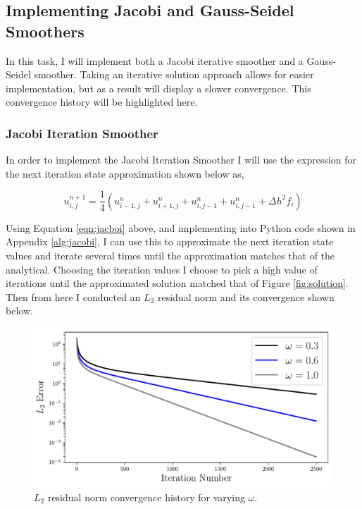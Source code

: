 \pagebreak
\subsection{Implementing Jacobi and Gauss-Seidel Smoothers}

In this task, I will implement both a Jacobi iterative smoother and a Gauss-Seidel smoother. Taking an iterative solution approach allows for easier implementation, but as a result will display a slower convergence. This convergence history will be highlighted here.

\subsubsection{Jacobi Iteration Smoother}
In order to implement the Jacobi Iteration Smoother I will use the expression for the next iteration state approximation shown below as,

\begin{equation}
    u_{i,j}^{n+1} = \frac{1}{4}\left(u_{i-1,j}^n + u_{i+1,j}^n + u_{i,j-1}^n + u_{i,j-1}^n + \Delta h^2f_i\right)
    \label{eqn:jacboi}
\end{equation}

Using Equation \ref{eqn:jacboi} above, and implementing into Python code shown in Appendix \ref{alg:jacobi}, I can use this to approximate the next iteration state values and iterate several times until the approximation matches that of the analytical. Choosing the iteration values I choose to pick a high value of iterations until the approximated solution matched that of Figure \ref{fig:solution}. Then from here I conducted an $L_2$ residual norm and its convergence shown below.

\begin{figure}[h]
    \centering
    \includegraphics[width = 0.9\linewidth]{tasks/figs/jacobi_l2.pdf}
    \caption[Jacboi Smoother Iteration]{$L_2$ residual norm convergence history for varying $\omega$.}
    \label{fig:jacobi}
\end{figure}

